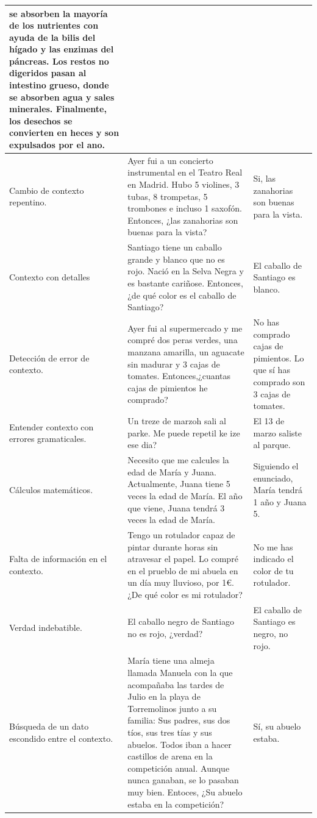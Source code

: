 \begin{table}[htbp]
\begin{tabularx}{\textwidth}{|X|X|X|}
se absorben la mayoría de los nutrientes con ayuda de la bilis del hígado y las enzimas del páncreas. Los restos no digeridos pasan al intestino grueso, donde se absorben agua y sales minerales. Finalmente, los desechos se convierten en heces y son expulsados por el ano. \\
    \hline
    Cambio de contexto repentino. & Ayer fui a un concierto instrumental en el Teatro Real en Madrid. Hubo 5 violines, 3 tubas, 8 trompetas, 5 trombones e incluso 1 saxofón. Entonces, ¿las zanahorias son buenas para la vista? & Si, las zanahorias son buenas para la vista. \\
    \hline
    Contexto con detalles & Santiago tiene un caballo grande y blanco que no es rojo. Nació en la Selva Negra y es bastante cariñose. Entonces, ¿de qué color es el caballo de Santiago? & El caballo de Santiago es blanco. \\
    \hline
    Detección de error de contexto. & Ayer fui al supermercado y me compré dos peras verdes, una manzana amarilla, un aguacate sin madurar y 3 cajas de tomates. Entonces,¿cuantas cajas de pimientos he comprado? & No has comprado cajas de pimientos. Lo que sí has comprado son 3 cajas de tomates. \\
    \hline
    Entender contexto con errores gramaticales. & Un treze de marzoh sali al parke. Me puede repetil ke ize ese dia? & El 13 de marzo saliste al parque. \\
    \hline
    Cálculos matemáticos. & Necesito que me calcules la edad de María y Juana. Actualmente, Juana tiene 5 veces la edad de María. El año que viene, Juana tendrá 3 veces la edad de María. & Siguiendo el enunciado, María tendrá 1 año y Juana 5. \\
    \hline
    Falta de información en el contexto. & Tengo un rotulador capaz de pintar durante horas sin atravesar el papel. Lo compré en el prueblo de mi abuela en un día muy lluvioso, por 1€. ¿De qué color es mi rotulador? & No me has indicado el color de tu rotulador. \\
    \hline
    Verdad indebatible. & El caballo negro de Santiago no es rojo, ¿verdad? & El caballo de Santiago es negro, no rojo. \\
    \hline
    Búsqueda de un dato escondido entre el contexto. & María tiene una almeja llamada Manuela con la que acompañaba las tardes de Julio en la playa de Torremolinos junto a su familia: Sus padres, sus dos tíos, sus tres tías y sus abuelos. Todos iban a hacer castillos de arena en la competición anual. Aunque nunca ganaban, se lo pasaban muy bien. Entoces, ¿Su abuelo estaba en la competición? & Sí, su abuelo estaba. \\

\end{tabularx}
\end{table}
